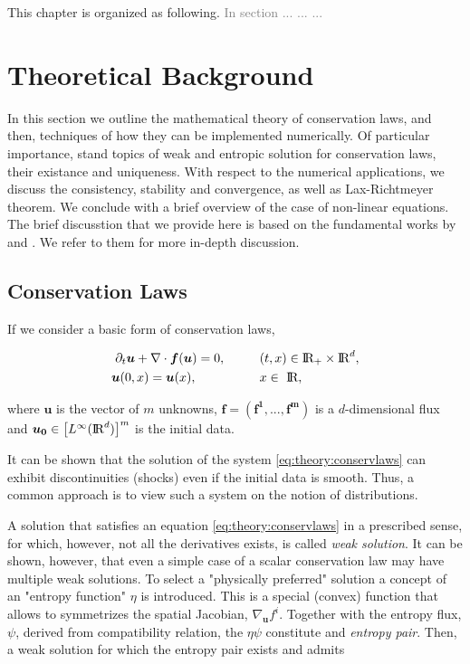 \documentclass[11pt,a4paper,headinclude=true,DIV=14,BCOR=8mm,chapterprefix,listof=totoc,twoside,openright,abstracton]{scrbook}
\newcommand{\gray}[1]{\textcolor{gray}{#1}}
\begin{document}
This chapter is organized as following. \gray{In section ... ... ... }

\section{Theoretical Background}
\label{sec:theory:conserv_laws:theorback}

In this section we outline the mathematical theory of conservation laws, and then, techniques of how they can be implemented numerically. Of particular importance, stand topics of weak and entropic solution for conservation laws, their existance and uniqueness. With respect to the numerical applications, we discuss the consistency, stability and convergence, as well as Lax-Richtmeyer theorem. We conclude with a brief overview of the case of non-linear equations. The brief discusstion that we provide here is based on the fundamental works by \cite{LeVeque:1992} and \cite{Tadmor1998}. We refer to them for more in-depth discussion. 

\subsection{Conservation Laws}

If we consider a basic form of conservation laws, 

\begin{align} 
\partial_t\boldsymbol{u} + \nabla\cdot\boldsymbol{f}(\boldsymbol{u}) = 0, \hspace{10mm} &(t,x)\in \text{I\!R}_{+}\times\text{I\!R}^d , \\
\boldsymbol{u}(0, x) = \boldsymbol{u}(x), \hspace{18mm} &x\in \text{ I\!R},
\label{eq:theory:conservlaws}
\end{align}

where $\boldsymbol{u}$ is the vector of $m$ unknowns, $\boldsymbol{f}=(\boldsymbol{\boldsymbol{f}^1,...,\boldsymbol{f}^m})$ is a $d$-dimensional flux and $\boldsymbol{u_0}\in\big[L^{\infty}(\text{I\!R}^d)\big]^m$ is the initial data. 

It can be shown that the solution of the system \ref{eq:theory:conservlaws} can exhibit discontinuities (shocks) even if the initial data is smooth. Thus, a common approach is to view such a system on the notion of distributions. 

A solution that satisfies an equation \ref{eq:theory:conservlaws} in a prescribed sense, for which, however, not all the derivatives exists, is called \textit{weak solution}. It can be shown, however, that even a simple case of a scalar conservation law may have multiple weak solutions. To select a "physically preferred" solution a concept of an "entropy function" $\eta$ is introduced. This is a special (convex) function that allows to symmetrizes the spatial Jacobian, $\nabla_{\boldsymbol{u}}f^i$. Together with the entropy flux, $\psi$, derived from compatibility relation, the $\eta\psi$ constitute and \textit{entropy pair}. Then, a weak solution for which the entropy pair exists and admits
\end{document}
